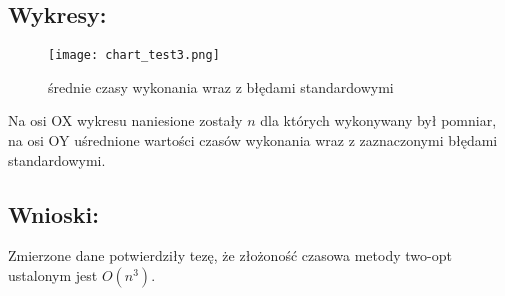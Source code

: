 \subsection{Wykresy: }
\begin{figure}[htb]
    \centering
    \texttt{[image: chart\_test3.png]}
    \caption{średnie czasy wykonania wraz z błędami standardowymi}
\end{figure}
Na osi OX wykresu naniesione zostały \(n\) dla których wykonywany był pomniar, na osi OY uśrednione wartości czasów wykonania wraz z zaznaczonymi błędami standardowymi.

\subsection{Wnioski: }
Zmierzone dane potwierdziły tezę, że złożoność czasowa metody two-opt ustalonym jest \(O(n^3)\). 

